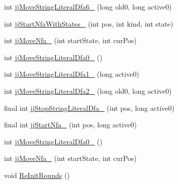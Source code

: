 \begin{DoxyCompactItemize}
int \hyperlink{classuk_1_1ac_1_1manchester_1_1cs_1_1owl_1_1owlapi_1_1turtle_1_1parser_1_1_turtle_parser_token_manager_a59c97f9f2f5ec99c7c44fb8bc8b29882}{jj\-Move\-String\-Literal\-Dfa6\-\_} (long old0, long active0)
\item 
int \hyperlink{classuk_1_1ac_1_1manchester_1_1cs_1_1owl_1_1owlapi_1_1turtle_1_1parser_1_1_turtle_parser_token_manager_a455d758e9c4cc03d3d3fddeecb291858}{jj\-Start\-Nfa\-With\-States\-\_} (int pos, int kind, int state)
\item 
int \hyperlink{classuk_1_1ac_1_1manchester_1_1cs_1_1owl_1_1owlapi_1_1turtle_1_1parser_1_1_turtle_parser_token_manager_aa567ede27493bbb2baa88d4d630e19dd}{jj\-Move\-Nfa\-\_} (int start\-State, int cur\-Pos)
\item 
int \hyperlink{classuk_1_1ac_1_1manchester_1_1cs_1_1owl_1_1owlapi_1_1turtle_1_1parser_1_1_turtle_parser_token_manager_aab1ffd98b0a4ea2a3a2a385d38b413a3}{jj\-Move\-String\-Literal\-Dfa0\-\_} ()
\item 
int \hyperlink{classuk_1_1ac_1_1manchester_1_1cs_1_1owl_1_1owlapi_1_1turtle_1_1parser_1_1_turtle_parser_token_manager_a5c5b97a0373aad5c6324d9d8ef57a54a}{jj\-Move\-String\-Literal\-Dfa1\-\_} (long active0)
\item 
int \hyperlink{classuk_1_1ac_1_1manchester_1_1cs_1_1owl_1_1owlapi_1_1turtle_1_1parser_1_1_turtle_parser_token_manager_aaf9ab07503fd01903807963774f3614d}{jj\-Move\-String\-Literal\-Dfa2\-\_} (long old0, long active0)
\item 
final int \hyperlink{classuk_1_1ac_1_1manchester_1_1cs_1_1owl_1_1owlapi_1_1turtle_1_1parser_1_1_turtle_parser_token_manager_ac48a84a92a85c3dee527300adc33e3b6}{jj\-Stop\-String\-Literal\-Dfa\-\_} (int pos, long active0)
\item 
final int \hyperlink{classuk_1_1ac_1_1manchester_1_1cs_1_1owl_1_1owlapi_1_1turtle_1_1parser_1_1_turtle_parser_token_manager_a932a67aad5b6155dd75d3bf512cf7c72}{jj\-Start\-Nfa\-\_} (int pos, long active0)
\item 
int \hyperlink{classuk_1_1ac_1_1manchester_1_1cs_1_1owl_1_1owlapi_1_1turtle_1_1parser_1_1_turtle_parser_token_manager_ab7e16633244da9221772740ed251a5ae}{jj\-Move\-String\-Literal\-Dfa0\-\_} ()
\item 
int \hyperlink{classuk_1_1ac_1_1manchester_1_1cs_1_1owl_1_1owlapi_1_1turtle_1_1parser_1_1_turtle_parser_token_manager_aa805d7df0f1b4e02b4c2045f4135a28f}{jj\-Move\-Nfa\-\_} (int start\-State, int cur\-Pos)
\item 
void \hyperlink{classuk_1_1ac_1_1manchester_1_1cs_1_1owl_1_1owlapi_1_1turtle_1_1parser_1_1_turtle_parser_token_manager_aa0a5cc14a96c4a95201eba5afcf0be7f}{Re\-Init\-Rounds} ()

\end{DoxyCompactItemize}
